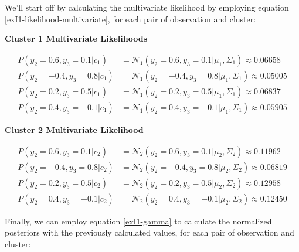 \documentclass[12pt]{article}
\begin{document}
\begin{enumerate}[leftmargin=\labelsep]
          We'll start off by calculating the multivariate likelihood by employing equation
          \eqref{exI1-likelihood-multivariate}, for each pair of observation and cluster:

          \begin{center}
              \textbf{\colorbox{bmint}{Cluster 1 Multivariate Likelihoods}}
          \end{center}

          \vskip -0.7cm
          \begingroup
          \addtolength{\jot}{0.5em}
          \begin{align*}
              P(y_2=0.6, y_3=0.1 | c_1) & = \mathcal{N}_1(y_2=0.6, y_3=0.1|\mu_1, \Sigma_1) \approx 0.06658 \\
              P(y_2=-0.4, y_3=0.8 | c_1) & = \mathcal{N}_1(y_2=-0.4, y_3=0.8|\mu_1, \Sigma_1) \approx 0.05005 \\
              P(y_2=0.2, y_3=0.5 | c_1) & = \mathcal{N}_1(y_2=0.2, y_3=0.5|\mu_1, \Sigma_1) \approx 0.06837 \\
              P(y_2=0.4, y_3=-0.1 | c_1) & = \mathcal{N}_1(y_2=0.4, y_3=-0.1|\mu_1, \Sigma_1) \approx 0.05905
          \end{align*}
          \endgroup

          \begin{center}
              \textbf{\colorbox{byellow}{Cluster 2 Multivariate Likelihood}}
          \end{center}

          \vskip -0.7cm
          \begingroup
          \addtolength{\jot}{0.7em}
          \begin{align*}
              P(y_2=0.6, y_3=0.1 | c_2) & = \mathcal{N}_2(y_2=0.6, y_3=0.1|\mu_2, \Sigma_2) \approx 0.11962 \\
              P(y_2=-0.4, y_3=0.8 | c_2) & = \mathcal{N}_2(y_2=-0.4, y_3=0.8|\mu_2, \Sigma_2) \approx 0.06819 \\
              P(y_2=0.2, y_3=0.5 | c_2) & = \mathcal{N}_2(y_2=0.2, y_3=0.5|\mu_2, \Sigma_2) \approx 0.12958 \\
              P(y_2=0.4, y_3=-0.1 | c_2) & = \mathcal{N}_2(y_2=0.4, y_3=-0.1|\mu_2, \Sigma_2) \approx 0.12450
          \end{align*}
          \endgroup

          \vskip 0.1cm
          Finally, we can employ equation \eqref{exI1-gamma} to calculate the normalized posteriors with the previously calculated values,
          for each pair of observation and cluster:


\end{enumerate}
\end{document}
